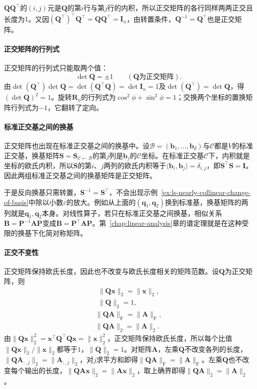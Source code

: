 $\bm Q\bm Q^\top$的$(i,j)$元是$\bm Q$的第$i$行与第$j$行的内积，所以正交矩阵的各行同样两两正交且长度为$1$。又因$(\bm Q^\top)^\top\bm Q^\top=\bm Q\bm Q^\top=\bm I_n$，由转置条件，$\bm Q^{-1}=\bm Q^\top$也是正交矩阵。

\paragraph{正交矩阵的行列式}
正交矩阵的行列式只能取两个值：
\[
 \det\bm Q=\pm1\qquad(\bm Q\text{为正交矩阵}).
\]
由$\det(\bm Q^\top)\det\bm Q=\det(\bm Q^\top\bm Q)=\det\bm I_n=1$及$\det(\bm Q^\top)=\det\bm Q$，得$(\det\bm Q)^2=1$。旋转$\bm R_\phi$的行列式为$\cos^2\phi+\sin^2\phi=1$；交换两个坐标的置换矩阵行列式为$-1$，它翻转了定向。

\paragraph{标准正交基之间的换基}
正交矩阵也出现在标准正交基之间的换基中。设$\mathcal B=(\bm b_1,\ldots,\bm b_d)$与$\mathcal C$都是$V$的标准正交基，换基矩阵$\bm S=\bm S_{\mathcal C\leftarrow\mathcal B}$的第$j$列是$\bm b_j$的$\mathcal C$坐标。在标准正交基$\mathcal C$下，内积就是坐标的欧氏内积，所以$\bm S$的第$i$、$j$两列的欧氏内积等于$\langle\bm b_i,\bm b_j\rangle=\delta_{i,j}$，即$\bm S^\top\bm S=\bm I$。因此两组标准正交基之间的换基矩阵是正交矩阵。

于是反向换基只需转置，$\bm S^{-1}=\bm S^\top$，不会出现示例~\ref{ex:ls-nearly-collinear-change-of-basis}中除以小数$\varepsilon$的放大。例如从上面的$(\bm q_1,\bm q_2)$换到标准基，换基矩阵的两列就是$\bm q_1,\bm q_2$本身。对线性算子，若只在标准正交基之间换基，相似关系$\bm B=\bm P^{-1}\bm A\bm P$变成$\bm B=\bm P^\top\bm A\bm P$。第~\ref{chap:linear-analysis}章的谱定理就是在这种受限的换基下化简对称矩阵。

\paragraph{正交不变性}
正交矩阵保持欧氏长度，因此也不改变与欧氏长度相关的矩阵范数。设$\bm Q$为正交矩阵，则
\[
 \begin{gathered}
 \lVert\bm Q\bm x\rVert_2=\lVert\bm x\rVert_2,\\
 \lVert\bm Q\rVert_2=1,
 \end{gathered}
\]
\[
 \begin{gathered}
 \lVert\bm Q\bm A\rVert_{\mathrm F}=\lVert\bm A\rVert_{\mathrm F},\\
 \lVert\bm Q\bm A\rVert_2=\lVert\bm A\rVert_2.
 \end{gathered}
\]
由$\lVert\bm Q\bm x\rVert_2^2=\bm x^\top\bm Q^\top\bm Q\bm x=\lVert\bm x\rVert_2^2$，正交矩阵保持欧氏长度，所以每个比值$\lVert\bm Q\bm x\rVert_2/\lVert\bm x\rVert_2$都等于$1$，$\lVert\bm Q\rVert_2=1$。对矩阵$\bm A$，左乘$\bm Q$不改变各列的长度，$\lVert\bm Q\bm A_{:,j}\rVert_2=\lVert\bm A_{:,j}\rVert_2$，对$j$求平方和即得$\lVert\bm Q\bm A\rVert_{\mathrm F}=\lVert\bm A\rVert_{\mathrm F}$。左乘$\bm Q$也不改变每个输出的长度，$\lVert\bm Q\bm A\bm x\rVert_2=\lVert\bm A\bm x\rVert_2$，取上确界即得$\lVert\bm Q\bm A\rVert_2=\lVert\bm A\rVert_2$。

